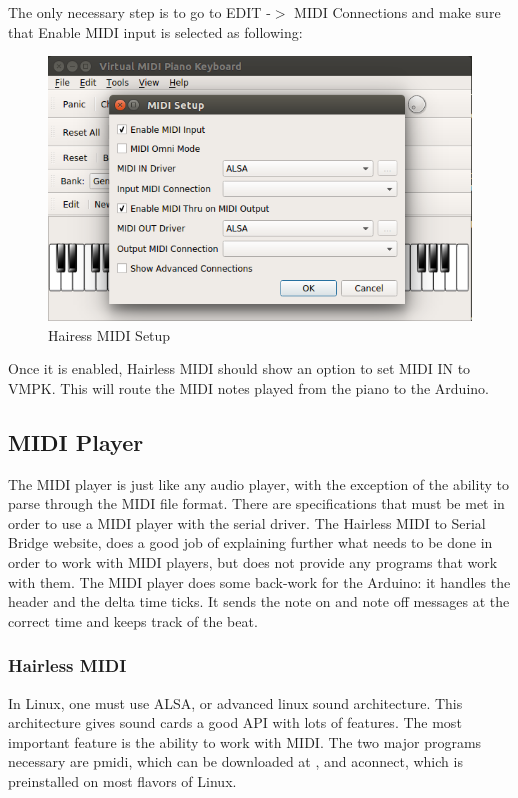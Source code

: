 \documentclass[11pt, a4paper]{report}
\begin{document}
The only necessary step is to go to EDIT -$>$ MIDI Connections and make sure that Enable MIDI input is selected as following:

\begin{figure}[H]
\hspace*{-2cm}    
    \centering
    \includegraphics[width=.75\textwidth]{HairlessSetup.png}
    \caption{Hairess MIDI Setup}
    \label{fig:hairlesssetup}
\end{figure} 

Once it is enabled, Hairless MIDI should show an option to set MIDI IN to VMPK. This will route the MIDI notes played from the piano to the Arduino. 

\subsection{MIDI Player}

The MIDI player is just like any audio player, with the exception of the ability to parse through the MIDI file format. There are specifications that must be met in order to use a MIDI player with the serial driver. The Hairless MIDI to Serial Bridge website, \cite{HairlessMIDI} does a good job of explaining further what needs to be done in order to work with MIDI players, but does not provide any programs that work with them. The MIDI player does some back-work for the Arduino: it handles the header and the delta time ticks. It sends the note on and note off messages at the correct time and keeps track of the beat. 

\subsubsection{Hairless MIDI}

In Linux, one must use ALSA, or advanced linux sound architecture. This architecture gives sound cards a good API with lots of features. The most important feature is the ability to work with MIDI. The two major programs necessary are pmidi, which can be downloaded at \cite{pmidi}, and aconnect, which is preinstalled on most flavors of Linux.
\end{document}
